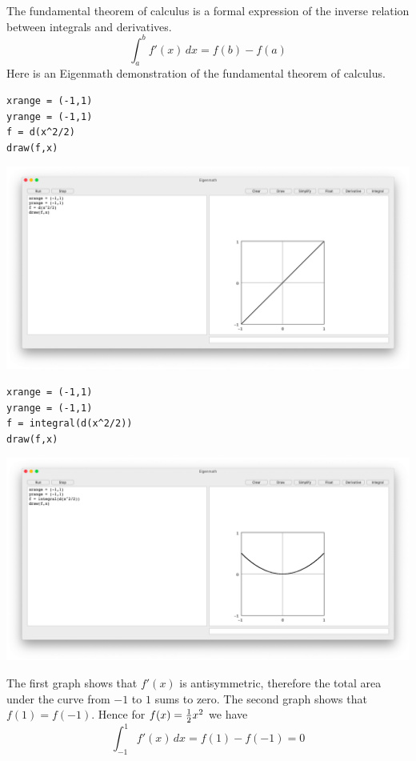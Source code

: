 The fundamental theorem of calculus
is a formal expression of the inverse relation between
integrals and derivatives.
$$\int_a^b f'(x)\,dx=f(b)-f(a)$$
Here is an Eigenmath demonstration of the fundamental theorem of calculus.

\begin{Verbatim}[formatcom=\color{blue},samepage=true]
xrange = (-1,1)
yrange = (-1,1)
f = d(x^2/2)
draw(f,x)
\end{Verbatim}

\begin{center}
\includegraphics[scale=0.2]{funda1.png}
\end{center}

\begin{Verbatim}[formatcom=\color{blue},samepage=true]
xrange = (-1,1)
yrange = (-1,1)
f = integral(d(x^2/2))
draw(f,x)
\end{Verbatim}

\begin{center}
\includegraphics[scale=0.2]{funda2.png}
\end{center}

The first graph shows that $f'(x)$ is antisymmetric, therefore the total
area under the curve from $-1$ to $1$ sums to zero.
The second graph shows that $f(1)=f(-1)$.
Hence for $f(x)={1\over2}x^2$ we have
$$\int_{-1}^1f'(x)\,dx=f(1)-f(-1)=0$$
